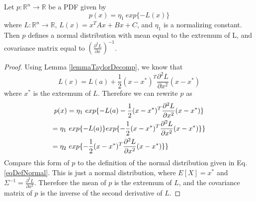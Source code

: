 \begin{lemma} 
	\label{lemmaHessianInverse}
	Let \(p: \mathbb{R}^n \to \mathbb{R}\) be a PDF given by \[
	p(x) = \eta_1\ exp\{ - L(x) \}
	\]
	where \(L: \mathbb{R}^n \to \mathbb{R}\), \(L(x) = x^T Ax + Bx + C\), and \(\eta_1\) is a normalizing constant. Then \(p\) defines a normal distribution with mean equal to the extremum of L, and covariance matrix equal to \((\frac{\partial^2 L}{\partial x})^{-1}\).
\end{lemma}
\begin{proof}
	Using Lemma \ref{lemmaTaylorDecomp}, we know that \[
	L(x) = L(a) + \frac{1}{2} (x-x^*)^T \frac{\partial^2 L}{\partial x^2} (x-x^*)
	\] where \(x^*\) is the extremum of \(L\).
	Therefore we can rewrite \(p\) as
	\begin{multline*}
	p(x) = \eta_1\ exp\{ -L(a) - \frac{1}{2} (x-x^*)^T \frac{\partial^2 L}{\partial x^2} (x-x^*)\} \\
	= \eta_1\ exp \{ -L(a) \} exp \{ - \frac{1}{2} (x-x^*)^T \frac{\partial^2 L}{\partial x^2} (x-x^*)\} \} \\
	= \eta_2\ exp \{ - \frac{1}{2} (x-x^*)^T \frac{\partial^2 L}{\partial x^2} (x-x^*)\} \} \hfill
	\end{multline*}
	Compare this form of \(p\) to the definition of the normal distribution given in Eq. \ref{eqDefNormal}. This is just a normal distribution, where \(E[X] = x^*\) and \(\Sigma^{-1} = \frac{\partial^2 L}{\partial x^2}\). Therefore the mean of \(p\) is the extremum of \(L\), and the covariance matrix of \(p\) is the inverse of the second derivative of \(L\). 
\end{proof}

